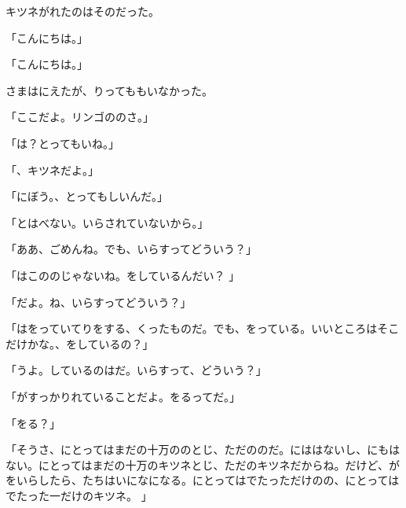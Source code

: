 キツネがれたのはそのだった。

「こんにちは。」

「こんにちは。」

さまはにえたが、りってももいなかった。

「ここだよ。リンゴののさ。」

「は？とってもいね。」

「、キツネだよ。」

「にぼう。、とってもしいんだ。」

「とはべない。いらされていないから。」

「ああ、ごめんね。でも、いらすってどういう？」

「はこののじゃないね。をしているんだい？ 」

「だよ。ね、いらすってどういう？」

「はをっていてりをする、くったものだ。でも、をっている。いいところはそこだけかな。、をしているの？」

「うよ。しているのはだ。いらすって、どういう？」

「がすっかりれていることだよ。をるってだ。」

「をる？」

「そうさ、にとってはまだの十万ののとじ、ただののだ。にははないし、にもはない。にとってはまだの十万のキツネとじ、ただのキツネだからね。だけど、がをいらしたら、たちはいになになる。にとってはでたっただけのの、にとってはでたった一だけのキツネ。 」

